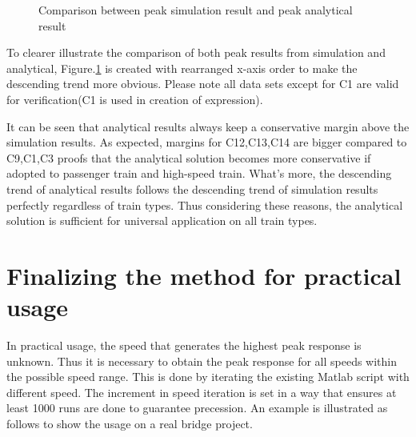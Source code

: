 \begin{figure}[h!]
\centering
{}
\caption{Comparison between peak simulation result and peak analytical result}
\label{fig:comparisonpeaksimulationanalytical}
\end{figure}

To clearer illustrate the comparison of both peak results from simulation and analytical, Figure.\ref{fig:comparisonpeaksimulationanalytical} is created with rearranged x-axis order to make the descending trend more obvious. Please note all data sets except for C1 are valid for verification(C1 is used in creation of expression).

It can be seen that analytical results always keep a conservative margin above the simulation results. As expected, margins for C12,C13,C14 are bigger compared to C9,C1,C3 proofs that the analytical solution becomes more conservative if adopted to passenger train and high-speed train. What's more, the descending trend of analytical results follows the descending trend of simulation results perfectly regardless of train types. Thus considering these reasons, the analytical solution is sufficient for universal application on all train types.

\section{Finalizing the method for practical usage}

In practical usage, the speed that generates the highest peak response is unknown. Thus it is necessary to obtain the peak response for all speeds within the possible speed range. This is done by iterating the existing Matlab script with different speed. The increment in speed iteration is set in a way that ensures at least 1000 runs are done to guarantee precession. An example is illustrated as follows to show the usage on a real bridge project.

